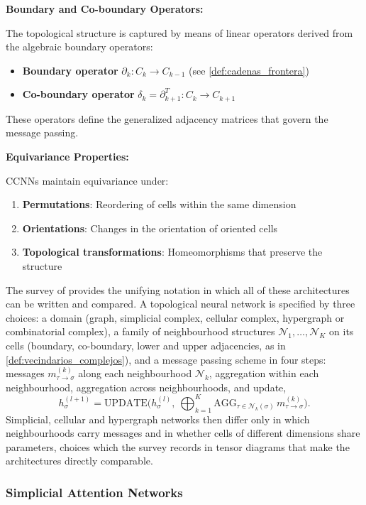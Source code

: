\textbf{Boundary and Co-boundary Operators:}

The topological structure is captured by means of linear operators derived from the algebraic boundary operators:
\begin{itemize}
    \item \textbf{Boundary operator} $\partial_k: C_k \to C_{k-1}$ (see \autoref{def:cadenas_frontera})
    \item \textbf{Co-boundary operator} $\delta_k = \partial_{k+1}^T: C_k \to C_{k+1}$
\end{itemize}

These operators define the generalized adjacency matrices that govern the message passing.

\textbf{Equivariance Properties:}

CCNNs maintain equivariance under:
\begin{enumerate}
    \item \textbf{Permutations}: Reordering of cells within the same dimension
    \item \textbf{Orientations}: Changes in the orientation of oriented cells
    \item \textbf{Topological transformations}: Homeomorphisms that preserve the structure
\end{enumerate}

The survey of \citet{papillon2023tdlarchitectures} provides the unifying notation in which all of these architectures can be written and compared. A topological neural network is specified by three choices: a domain (graph, simplicial complex, cellular complex, hypergraph or combinatorial complex), a family of neighbourhood structures $\mathcal{N}_1, \dots, \mathcal{N}_K$ on its cells (boundary, co-boundary, lower and upper adjacencies, as in \autoref{def:vecindarios_complejos}), and a message passing scheme in four steps: messages $m^{(k)}_{\tau \to \sigma}$ along each neighbourhood $\mathcal{N}_k$, aggregation within each neighbourhood, aggregation across neighbourhoods, and update,
\[h_\sigma^{(l+1)} = \text{UPDATE}\Big(h_\sigma^{(l)},\ \bigoplus_{k=1}^{K} \text{AGG}_{\tau \in \mathcal{N}_k(\sigma)}\, m^{(k)}_{\tau \to \sigma}\Big).\]
Simplicial, cellular and hypergraph networks then differ only in which neighbourhoods carry messages and in whether cells of different dimensions share parameters, choices which the survey records in tensor diagrams that make the architectures directly comparable.

\subsubsection{Simplicial Attention Networks}


